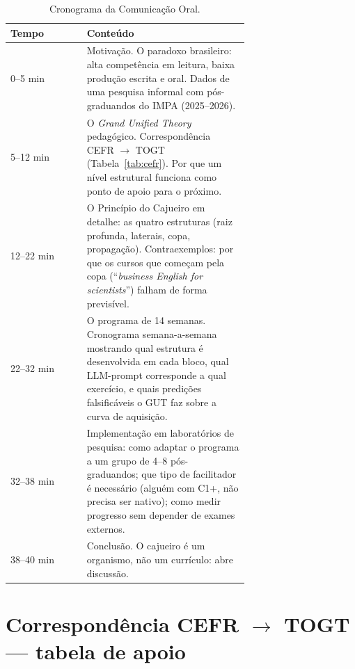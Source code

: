 \documentclass[11pt,a4paper]{article}
\begin{document}
\begin{table}[h]
\centering
\small
\begin{tabular}{@{}lp{0.68\linewidth}@{}}
\toprule
\textbf{Tempo} & \textbf{Conteúdo} \\
\midrule
0--5 min   & Motivação. O paradoxo brasileiro: alta competência em leitura, baixa produção escrita e oral. Dados de uma pesquisa informal com pós-graduandos do IMPA (2025--2026). \\
5--12 min  & O \emph{Grand Unified Theory} pedagógico. Correspondência CEFR $\to$ TOGT (Tabela~\ref{tab:cefr}). Por que um nível estrutural funciona como ponto de apoio para o próximo. \\
12--22 min & O Princípio do Cajueiro em detalhe: as quatro estruturas (raiz profunda, laterais, copa, propagação). Contraexemplos: por que os cursos que começam pela copa (``\emph{business English for scientists}'') falham de forma previsível. \\
22--32 min & O programa de 14 semanas. Cronograma semana-a-semana mostrando qual estrutura é desenvolvida em cada bloco, qual LLM-prompt corresponde a qual exercício, e quais predições falsificáveis o GUT faz sobre a curva de aquisição. \\
32--38 min & Implementação em laboratórios de pesquisa: como adaptar o programa a um grupo de 4--8 pós-graduandos; que tipo de facilitador é necessário (alguém com C1+, não precisa ser nativo); como medir progresso sem depender de exames externos. \\
38--40 min & Conclusão. O cajueiro é um organismo, não um currículo: abre discussão. \\
\bottomrule
\end{tabular}
\caption{Cronograma da Comunicação Oral.}
\end{table}

\section*{Correspondência CEFR $\to$ TOGT --- tabela de apoio}
\end{document}
